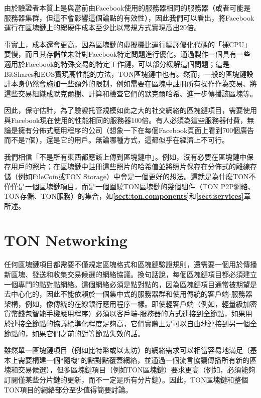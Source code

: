 \documentclass[12pt,oneside]{article}
\def\refpoint#1{{\rm\textbf{\ref{#1}}}}
\let\ptref=\refpoint
\def\mysection#1{\section{#1}\fancyhead[C]{\textsc{Chapter \textbf{\thesection.} #1}}}
\begin{document}
由於驗證者本質上是與當前由Facebook使用的服務器相同的服務器（或者可能是服務器集群，但這不會影響這個論點的有效性），因此我們可以看出，將Facebook運行在區塊鏈上的總硬件成本至少比以常規方式實現高出20倍。

事實上，成本還會更高，因為區塊鏈的虛擬機比運行編譯優化代碼的「裸CPU」要慢，而且其存儲並未針對Facebook特定問題進行優化。通過製作一個具有一些適用於Facebook的特殊交易的特定工作鏈，可以部分緩解這個問題；這是BitShares和EOS實現高性能的方法，TON區塊鏈中也有。然而，一般的區塊鏈設計本身仍然會施加一些額外的限制，例如需要在區塊中註冊所有操作作為交易、將這些交易組織成默克爾樹、計算和檢查它們的默克爾哈希、進一步傳播該區塊等。

因此，保守估計，為了驗證托管規模如此之大的社交網絡的區塊鏈項目，需要使用與Facebook現在使用的性能相同的服務器100倍。有人必須為這些服務器付費，無論是擁有分佈式應用程序的公司（想象一下在每個Facebook頁面上看到700個廣告而不是7個），還是它的用戶。無論哪種方式，這都似乎在經濟上不可行。

我們相信「不是所有東西都應該上傳到區塊鏈中」。例如，沒有必要在區塊鏈中保存用戶的照片；在區塊鏈中註冊這些照片的哈希值並將照片保存在分佈式的離線存儲（例如FileCoin或TON Storage）中會是一個更好的想法。這就是為什麼TON不僅僅是一個區塊鏈項目，而是一個圍繞TON區塊鏈的幾個組件（TON P2P網絡、TON存儲、TON服務）的集合，如\ptref{sect:ton.components}和\ptref{sect:services}章所述。

%
%
%
%

\clearpage
\mysection{TON Networking}\label{sect:network}

任何區塊鏈項目都需要不僅規定區塊格式和區塊鏈驗證規則，還需要一個用於傳播新區塊、發送和收集交易候選的網絡協議。換句話說，每個區塊鏈項目都必須建立一個專門的點對點網絡。這個網絡必須是點對點的，因為區塊鏈項目通常被期望是去中心化的，因此不能依賴於一個集中式的服務器群和使用傳統的客戶端-服務器架構，例如，像傳統的在線銀行應用程序一樣。即使輕客戶端（例如，輕量級加密貨幣錢包智能手機應用程序）必須以客戶端-服務器的方式連接到全節點，如果用於連接全節點的協議標準化程度足夠高，它們實際上是可以自由地連接到另一個全節點的，如果它們之前的對等節點失效的話。

雖然單一區塊鏈項目（例如比特幣或以太坊）的網絡需求可以相當容易地滿足（基本上需要構建一個“隨機”的點對點覆蓋網絡，並通過一個流言協議傳播所有新的區塊和交易候選），但多區塊鏈項目（例如TON區塊鏈）要求更高（例如，必須能夠訂閱僅某些分片鏈的更新，而不一定是所有分片鏈）。因此，TON區塊鏈和整個TON項目的網絡部分至少值得簡要討論。
\end{document}
